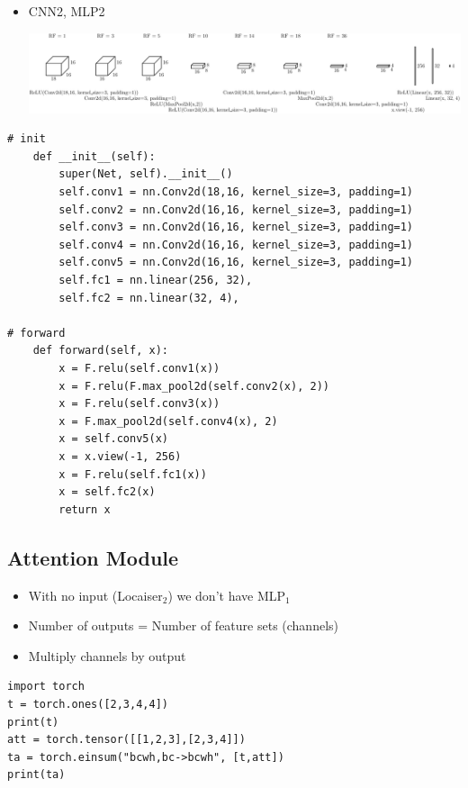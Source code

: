 \documentclass[11pt]{article}
\begin{document}
\begin{itemize}
\item CNN2, MLP2
\begin{center}
\includegraphics[width=.9\linewidth]{./figures/positioner.pdf}
\end{center}
\end{itemize}

\begin{verbatim}
# init
	def __init__(self):
		super(Net, self).__init__()
		self.conv1 = nn.Conv2d(18,16, kernel_size=3, padding=1)
		self.conv2 = nn.Conv2d(16,16, kernel_size=3, padding=1)
		self.conv3 = nn.Conv2d(16,16, kernel_size=3, padding=1)
		self.conv4 = nn.Conv2d(16,16, kernel_size=3, padding=1)
		self.conv5 = nn.Conv2d(16,16, kernel_size=3, padding=1)
		self.fc1 = nn.linear(256, 32),
		self.fc2 = nn.linear(32, 4),

# forward
	def forward(self, x):
		x = F.relu(self.conv1(x))
		x = F.relu(F.max_pool2d(self.conv2(x), 2))
		x = F.relu(self.conv3(x))
		x = F.max_pool2d(self.conv4(x), 2)
		x = self.conv5(x)
		x = x.view(-1, 256)
		x = F.relu(self.fc1(x))
		x = self.fc2(x)
		return x

\end{verbatim}

\subsection{Attention Module}
\label{sec:orgf4b668d}
\begin{itemize}
\item With no input (Locaiser\(_{\text{2}}\)) we don't have MLP\(_{\text{1}}\)
\item Number of outputs = Number of feature sets (channels)
\item Multiply channels by output
\end{itemize}
\begin{verbatim}
import torch
t = torch.ones([2,3,4,4])
print(t)
att = torch.tensor([[1,2,3],[2,3,4]])
ta = torch.einsum("bcwh,bc->bcwh", [t,att])
print(ta)
\end{verbatim}
\end{document}
